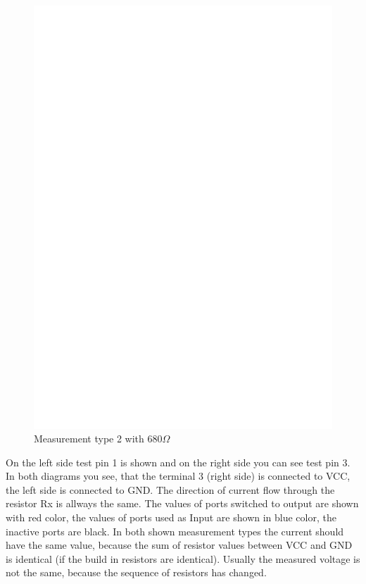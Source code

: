 \begin{figure}[H]
 \centering
 \includegraphics[]{../FIG/ResistormessL2.eps}
 \caption{Measurement type 2 with \(680\Omega\) }
\label{fig:RL2mes}
\end{figure}

On the left side test pin 1 is shown and on the right side you can see test pin 3.
In both diagrams you see, that the terminal 3 (right side) is connected to VCC, the left side is
connected to GND. The direction of current flow through the resistor Rx is allways the same. 
The values of ports switched to output are shown with red color, the values of 
ports used as Input are shown in blue color, the inactive ports are black.
In both shown measurement types the current should have the same value, because the sum of resistor values
between VCC and GND is identical (if the build in resistors are identical).
Usually the measured voltage is not the same, because the sequence
of resistors has changed.

